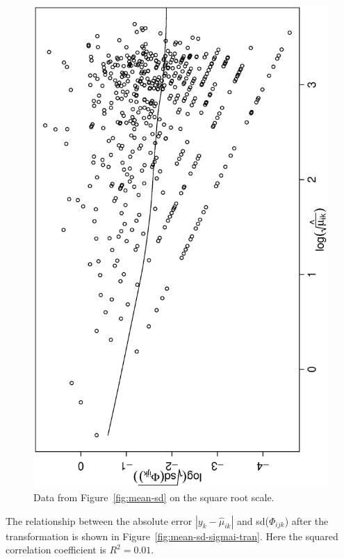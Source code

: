 \documentclass[11pt, fleqn]{article}
\begin{document}
\begin{figure}[t]
\begin{center}
\begin{minipage}{8cm}
\end{minipage}
\hfill
\begin{minipage}{8cm}
\includegraphics[scale=0.3, angle=-90]{pic/hu_lmean_lsd_all_tran.ps}
\end{minipage}
\caption{\label{fig:mean-sd-tran}\small Data from Figure~\ref{fig:mean-sd} on
  the square root scale.}
\end{center}
\end{figure}

The relationship between the absolute error $|y_k - \hat{\mu}_{ik}|$ and
sd($\Phi_{ijk}$) after the transformation is shown in
Figure~\ref{fig:mean-sd-sigmai-tran}. Here the squared correlation coefficient
is $R^2=0.01$.
\end{document}
